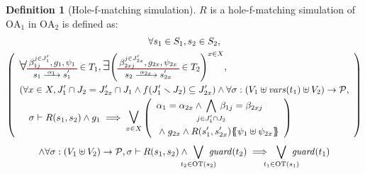 \documentclass{article}
\theoremstyle{plain}
\theoremstyle{definition}
\newtheorem{defi}{Definition}
\newcommand\nmm[1]{\(\displaystyle #1\)} %
\newcommand\mpar[1]{{\left(#1\right)}}
\newcommand\mbrc[1]{{\left\{#1\right\}}}
\newcommand\psubst[1]{\mbrc{\!\!\mbrc{#1}\!\!}}
\newcommand\subbox[1]{{\makebox[.5\width]{\(\scriptstyle #1\)}}}
\newcommand\bigsymb[2][\Large]{\text{#1\nmm{#2}}} %
\newcommand\nwedge{\DOTSB\;{\wedge}\;} %
\newcommand\fvars[1]{{\mathit{vars}\mpar{#1}}}
\newcommand\values{{\mathcal{P}}}
\newcommand\OT[6]{\text{\small\(%
	\setlength\arraycolsep{2pt}\everymath{\displaystyle}%
	\renewcommand\arraystretch{1}%
	\begin{array}{c}%
	#4,#5,#6 \\\noalign{\color{red}\hrule height 1pt}
	#1\xrightarrow{\raisebox{-1.5pt}[.8\height][0pt]{\makebox[1.4\width]{\(\scriptstyle #3\)}}}#2
	\end{array}\)}}
\newcommand\OTx[4]{\OT{s_{#1}}{s'_{#1 #2}}{\alpha_{#1 #2}}{\beta_{#3 j}^{j \in J'_{#4}}}{g_{#1 #2}}{\psi_{#1 #2}}}
\begin{document}
\begin{defi}[Hole-f-matching simulation]
\(R\) is a hole-f-matching simulation of \(\mathrm{OA}_1\) in \(\mathrm{OA}_2\) is defined as:
\begin{multline*}
	\forall s_1 \in S_1, s_2 \in S_2, \\
	\mpar{\renewcommand\arraystretch{1.4}\everymath{\displaystyle}\begin{array}{l}
		\bigsymb{\forall} \OTx{1}{}{1}{1} \in T_1, \bigsymb{\exists} \mpar{\OTx{2}{x}{2x}{2x} \in T_2}^{x \in X}, \\
		\mpar{\forall x \in X, J'_1 \cap J_2 = J'_{2x} \cap J_1 \wedge f\mpar{J'_1 \setminus J_2} \subseteq J'_{2x}} \wedge \forall \sigma: \mpar{V_1 \uplus \fvars{t_1} \uplus V_2} \to \values, \\
		\quad \sigma \vdash R\mpar{s_1, s_2} \wedge g_1 \implies \operatorname*{\bigsymb{\bigvee}}_{x \in X} \mpar{\begin{array}{l}
			\alpha_1 = \alpha_{2x} \wedge \bigwedge_\subbox{j \in J'_1 \cap J_2} \beta_{1j} = \beta_{2xj} \\
			\nwedge g_{2x} \wedge R\mpar{s'_1, s'_{2x}}\psubst{\psi_1 \uplus \psi_{2x}}
		\end{array}} \\
	\end{array}} \\
	\wedge \forall \sigma: \mpar{V_1 \uplus V_2} \to \values, \sigma \vdash R\mpar{s_1, s_2} \wedge \bigvee_\subbox{t_2 \in \mathrm{OT}\mpar{s_2}} \mathit{guard}\mpar{t_2} \implies \bigvee_\subbox{t_1 \in \mathrm{OT}\mpar{s_1}} \mathit{guard}\mpar{t_1}
\end{multline*}
\end{defi}
\end{document}
